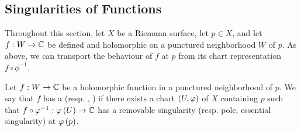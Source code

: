 \documentclass[../Moduli_Spaces_of_Riemann_Surfaces.tex]{subfiles}
\begin{document}
    \subsection{Singularities of Functions}
    Throughout this section, let $X$ be a Riemann surface, let $p\in X$, and let $f:W\to\mathbb{C}$ be defined and holomorphic on a punctured neighborhood $W$ of $p$. As above, we can transport the behaviour of $f$ at $p$ from its chart representation $f\circ\phi^{-1}$.
    \begin{definition}
        Let $f:W\to\mathbb{C}$ be a holomorphic function in a punctured neighborhood of $p$. We say that $f$ has a  (resp. , )  if there exists a chart $\left(U,\varphi\right)$ of $X$ containing $p$ such that $f\circ\varphi^{-1}:\varphi\left(U\right)\to\mathbb{C}$ has a removable singularity (resp. pole, essential singularity) at $\varphi\left(p\right)$.
    \end{definition}
\end{document}

